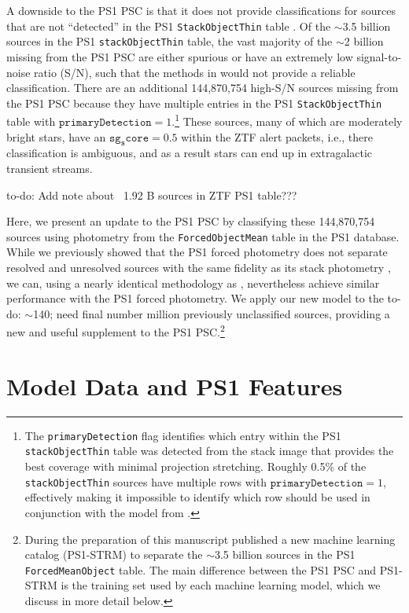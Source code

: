 \documentclass[twocolumn]{aastex63}
\newcommand{\todo}[1]{{\color{magenta} to-do: {#1}}}
\begin{document}
A downside to the PS1 PSC is that it does not provide classifications for
sources that are not ``detected'' in the PS1 \texttt{StackObjectThin} table
\citep[the definition of a PS1 stack detection is given in][]{Tachibana18}. Of
the $\sim$3.5 billion sources in the PS1 \texttt{stackObjectThin} table, the
vast majority of the $\sim$2 billion missing from the PS1 PSC are either
spurious or have an extremely low signal-to-noise ratio (S/N), such that the
methods in \citet{Tachibana18} would not provide a reliable classification.
There are an additional 144,870,754 high-S/N
sources missing from the PS1 PSC because they have multiple entries in the PS1
\texttt{StackObjectThin} table with $\mathtt{primaryDetection} =
1$.\footnote{The \texttt{primaryDetection} flag identifies which entry within
the PS1 \texttt{stackObjectThin} table was detected from the stack image that
provides the best coverage with minimal projection stretching. Roughly 0.5\%
of the \texttt{stackObjectThin} sources have multiple rows with
$\mathtt{primaryDetection} = 1$, effectively making it impossible to identify
which row should be used in conjunction with the model from
\citet{Tachibana18}.} These sources, many of which are moderately bright
stars, have an $\mathtt{sg_score} = 0.5$ within the ZTF alert packets, i.e.,
there classification is ambiguous, and as a result stars can end up in
extragalactic transient streams.

\todo{Add note about ~1.92 B sources in ZTF PS1 table???}

Here, we present an update to the PS1 PSC by classifying these
144,870,754 sources using photometry from the
\texttt{ForcedObjectMean} table in the PS1 database. While we previously
showed that the PS1 forced photometry does not separate resolved and
unresolved sources with the same fidelity as its stack photometry
\citep{Tachibana18}, we can, using a nearly identical methodology as
\citet{Tachibana18}, nevertheless achieve similar performance with the PS1
forced photometry. We apply our new model to the \todo{$\sim$140; need final
number} million previously unclassified sources, providing a new and useful
supplement to the PS1 PSC.\footnote{During the preparation of this manuscript
\citet{Beck20} published a new machine learning catalog (PS1-STRM) to separate
the $\sim$3.5 billion sources in the PS1 \texttt{ForcedMeanObject} table. The
main difference between the PS1 PSC and PS1-STRM is the training set used by
each machine learning model, which we discuss in more detail below.}

\section{Model Data and PS1 Features}
\end{document}
